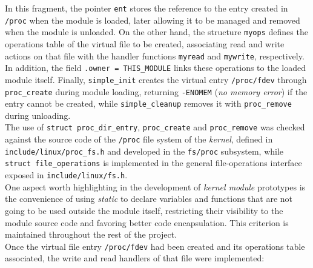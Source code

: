 In this fragment, the pointer \verb|ent| stores the reference to the entry created in \texttt{/proc} when the module is loaded, later allowing it to be managed and removed when the module is unloaded.
On the other hand, the structure \verb|myops| defines the operations table of the virtual file to be created, associating read and write actions on that file with the handler functions \verb|myread| and \verb|mywrite|, respectively.
In addition, the field \verb|.owner = THIS_MODULE| links these operations to the loaded module itself.
Finally, \verb|simple_init| creates the virtual entry \texttt{/proc/fdev} through \verb|proc_create| during module loading, returning \texttt{-ENOMEM} (\textit{no memory error}) if the entry cannot be created, while \verb|simple_cleanup| removes it with \verb|proc_remove| during unloading.\\

The use of \verb|struct proc_dir_entry|, \verb|proc_create| and \verb|proc_remove| was checked against the source code of the \texttt{/proc} file system of the \textit{kernel}, defined in \texttt{include/linux/proc\_fs.h} and developed in the \texttt{fs/proc} subsystem, while \verb|struct file_operations| is implemented in the general file-operations interface exposed in \texttt{include/linux/fs.h}.\\

One aspect worth highlighting in the development of \textit{kernel module} prototypes is the convenience of using \textit{static} to declare variables and functions that are not going to be used outside the module itself, restricting their visibility to the module source code and favoring better code encapsulation. This criterion is maintained throughout the rest of the project.\\

Once the virtual file entry \texttt{/proc/fdev} had been created and its operations table associated, the write and read handlers of that file were implemented:

